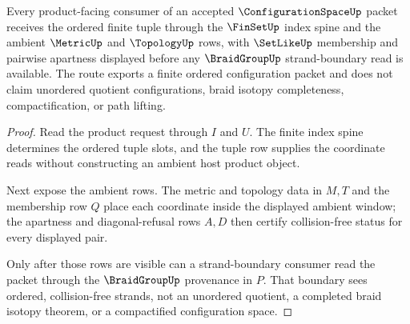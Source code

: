 \begin{theorem}
\label{thm:configuration-space-finite-product-route}
Every product-facing consumer of an accepted $\ConfigurationSpaceUp$ packet receives the ordered finite tuple through the $\FinSetUp$ index spine and the ambient $\MetricUp$ and $\TopologyUp$ rows, with $\SetLikeUp$ membership and pairwise apartness displayed before any $\BraidGroupUp$ strand-boundary read is available. The route exports a finite ordered configuration packet and does not claim unordered quotient configurations, braid isotopy completeness, compactification, or path lifting.
\end{theorem}
\begin{proof}
Read the product request through $I$ and $U$. The finite index spine determines the ordered tuple slots, and the tuple row supplies the coordinate reads without constructing an ambient host product object.

Next expose the ambient rows. The metric and topology data in $M,T$ and the membership row $Q$ place each coordinate inside the displayed ambient window; the apartness and diagonal-refusal rows $A,D$ then certify collision-free status for every displayed pair.

Only after those rows are visible can a strand-boundary consumer read the packet through the $\BraidGroupUp$ provenance in $P$. That boundary sees ordered, collision-free strands, not an unordered quotient, a completed braid isotopy theorem, or a compactified configuration space.
\end{proof}


\begin{closurestatus}{\ConfigurationSpaceUp}
  \theoryclosure{\seedClosure}
  \formalstatus{\unformalizedV}
\end{closurestatus}
